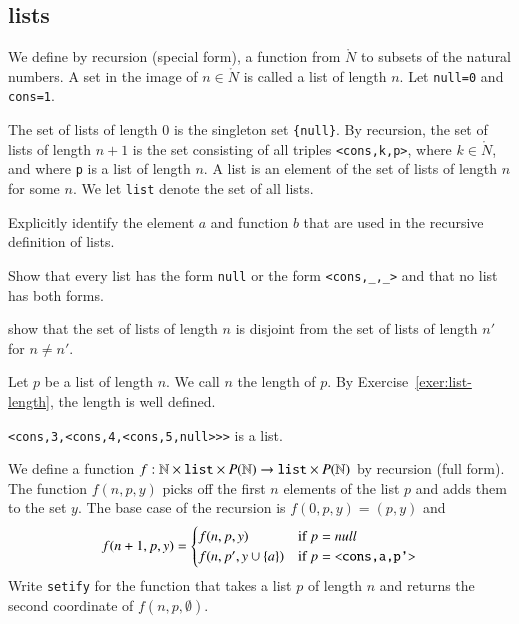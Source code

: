 \subsection{lists}

We define by recursion (special form), a function from $\ring{N}$ to subsets of the natural numbers.  A set in the image of $n\in\ring{N}$ is called a list of length $n$.  Let \verb!null=0! and \verb!cons=1!.

\begin{definition}
The set of lists of length $0$ is the singleton set \verb!{null}!.  By recursion, the set of  lists of length $n+1$ is the set
consisting of all  triples \verb!<cons,k,p>!, where $k\in\ring{N}$, and where \verb!p! is a  list of length $n$.   A  list is an element of the set of  lists of length $n$ for some $n$.  We let \verb!list! denote the set of all  lists.
\end{definition}

\begin{exer} Explicitly identify the element $a$ and function $b$ that are used in the recursive definition of  lists.
\end{exer}

\begin{exer} Show that every list has the form \verb!null! or the form \verb!<cons,_,_>! and that no list has both forms.
\end{exer}

\begin{exer}\label{exer:list-length} show that the set of  lists of length $n$ is disjoint from the set of  lists of length $n'$ for $n\ne n'$.
\end{exer}

\begin{definition} Let $p$ be a  list of length $n$.  We call $n$ the length of $p$.  By Exercise~\ref{exer:list-length}, the length is well defined.
\end{definition}


\begin{example}
\verb!<cons,3,<cons,4,<cons,5,null>>>!
is a  list.
\end{example}

\begin{definition}[setify]
We define a function $f:\ring{N}\times \verb!list!\times P(\ring{N})\to \verb!list!\times P(\ring{N})$ by recursion (full form).  The function $f(n,p,y)$ picks off the first $n$ elements of the  list $p$ and adds them to the set $y$.  The base case of the recursion is $f(0,p,y) = (p,y)$ and
$$
f(n+1,p,y) = \begin{cases} f(n,p,y) & \hbox{if } p = null\\
                f(n,p',y\cup\{a\}) & \hbox{if } p = \verb!<cons,a,p'>!\\
\end{cases}
$$
Write \verb!setify! for the function that takes a  list $p$
of length $n$ and returns the second coordinate of $f(n,p,\emptyset)$.
\end{definition}

